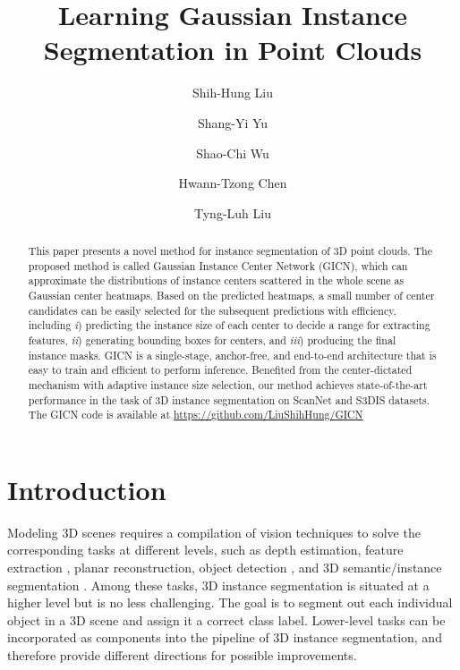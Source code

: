 \documentclass[runningheads]{llncs}
\begin{document}
\pagestyle{headings}
\mainmatter
\def\ECCVSubNumber{5817}  

\title{Learning Gaussian Instance Segmentation in Point Clouds} 

\begin{comment}
\titlerunning{ECCV-20 submission ID \ECCVSubNumber} 
\authorrunning{ECCV-20 submission ID \ECCVSubNumber} 
\author{Anonymous ECCV submission}
\institute{Paper ID \ECCVSubNumber}
\end{comment}


\author{Shih-Hung Liu \and
Shang-Yi Yu \and
Shao-Chi Wu \and Hwann-Tzong Chen \and Tyng-Luh Liu}
\maketitle

\begin{abstract}
 This paper presents a novel method for instance segmentation of 3D point clouds. The proposed method is called Gaussian Instance Center Network (GICN), which can approximate the distributions of instance centers scattered in the whole scene as Gaussian center heatmaps. Based on the predicted heatmaps, a small number of center candidates can be easily selected for the subsequent predictions with efficiency, including {\em i}) predicting the instance size of each center to decide a range for extracting features, {\em ii}) generating bounding boxes for centers, and {\em iii}) producing the final instance masks. GICN is a single-stage, anchor-free, and end-to-end architecture that is easy to train and efficient to perform inference. Benefited from the center-dictated mechanism with adaptive instance size selection, our method achieves state-of-the-art performance in the task of 3D instance segmentation on ScanNet and S3DIS datasets. The GICN code is available at \url{https://github.com/LiuShihHung/GICN}
\end{abstract}






\section{Introduction}
Modeling 3D scenes requires a compilation of vision techniques to solve the corresponding tasks at different levels, such as depth estimation, feature extraction \cite{QiSMG17,QiYSG17}, planar reconstruction, object detection \cite{QiLHG19,QiLWSG18,SindagiZT19,ZhouT18}, and 3D semantic/instance segmentation \cite{LahoudGPO19,WangYHN18,YangWCHWMT19,YiZWSG19}. Among these tasks, 3D instance segmentation is situated at a higher level but is no less challenging. The goal is to segment out each individual object in a 3D scene and assign it a correct class label. Lower-level tasks can be incorporated as components into the pipeline of 3D instance segmentation, and therefore provide different directions for possible improvements. 
\end{document}
